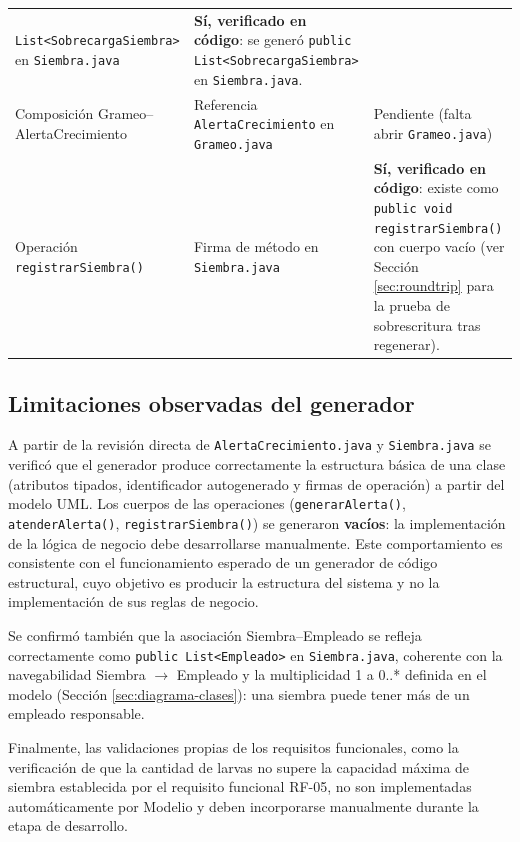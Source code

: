 \documentclass[11pt,a4paper]{article}
\begin{document}
\begin{center}
\begin{tabularx}{\linewidth}{>{\raggedright\arraybackslash}p{3.7cm}XX}
\texttt{List<SobrecargaSiembra>} en \texttt{Siembra.java} & \textbf{Sí,
verificado en código}: se generó \texttt{public List<SobrecargaSiembra>} en
\texttt{Siembra.java}. \\
Composición Grameo--AlertaCrecimiento & Referencia \texttt{AlertaCrecimiento} en
\texttt{Grameo.java} & Pendiente (falta abrir \texttt{Grameo.java}) \\
Operación \texttt{registrarSiembra()} & Firma de método en \texttt{Siembra.java} &
\textbf{Sí, verificado en código}: existe como \texttt{public void
registrarSiembra()} con cuerpo vacío (ver Sección \ref{sec:roundtrip} para la
prueba de sobrescritura tras regenerar). \\
\bottomrule
\end{tabularx}
\end{center}

\newpage
\subsection{Limitaciones observadas del generador}
\label{sec:limitaciones}
A partir de la revisión directa de \texttt{AlertaCrecimiento.java} y
\texttt{Siembra.java} se verificó que el generador produce correctamente la
estructura básica de una clase (atributos tipados, identificador autogenerado y
firmas de operación) a partir del modelo UML. Los cuerpos de las operaciones
(\texttt{generarAlerta()}, \texttt{atenderAlerta()}, \texttt{registrarSiembra()})
se generaron \textbf{vacíos}: la implementación de la lógica de negocio debe
desarrollarse manualmente. Este comportamiento es consistente con el
funcionamiento esperado de un generador de código estructural, cuyo objetivo es
producir la estructura del sistema y no la implementación de sus reglas de
negocio.

Se confirmó también que la asociación Siembra--Empleado se refleja
correctamente como \texttt{public List<Empleado>} en \texttt{Siembra.java},
coherente con la navegabilidad Siembra $\rightarrow$ Empleado y la
multiplicidad 1 a 0..* definida en el modelo (Sección
\ref{sec:diagrama-clases}): una siembra puede tener más de un empleado
responsable.

Finalmente, las validaciones propias de los requisitos funcionales, como la
verificación de que la cantidad de larvas no supere la capacidad máxima de
siembra establecida por el requisito funcional RF-05, no son implementadas
automáticamente por Modelio y deben incorporarse manualmente durante la etapa de
desarrollo.
\end{document}
